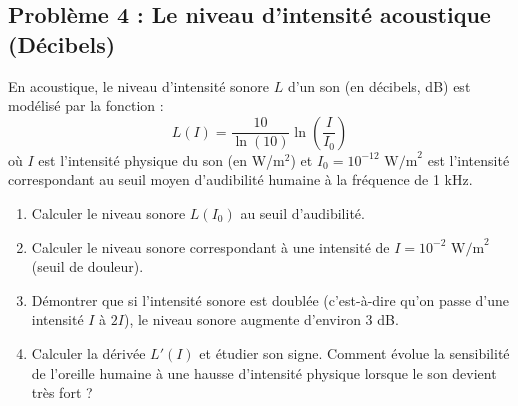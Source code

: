\subsection*{Problème 4 : Le niveau d'intensité acoustique (Décibels)}
En acoustique, le niveau d'intensité sonore $L$ d'un son (en décibels, dB) est modélisé par la fonction :
\[
L(I) = \frac{10}{\ln(10)} \ln\left(\frac{I}{I_0}\right)
\]
où $I$ est l'intensité physique du son (en W/m$^2$) et $I_0 = 10^{-12} \text{ W/m}^2$ est l'intensité correspondant au seuil moyen d'audibilité humaine à la fréquence de 1 kHz.
\begin{enumerate}
    \item Calculer le niveau sonore $L(I_0)$ au seuil d'audibilité.
    \item Calculer le niveau sonore correspondant à une intensité de $I = 10^{-2} \text{ W/m}^2$ (seuil de douleur).
    \item Démontrer que si l'intensité sonore est doublée (c'est-à-dire qu'on passe d'une intensité $I$ à $2I$), le niveau sonore augmente d'environ 3 dB.
    \item Calculer la dérivée $L'(I)$ et étudier son signe. Comment évolue la sensibilité de l'oreille humaine à une hausse d'intensité physique lorsque le son devient très fort ?
\end{enumerate}

